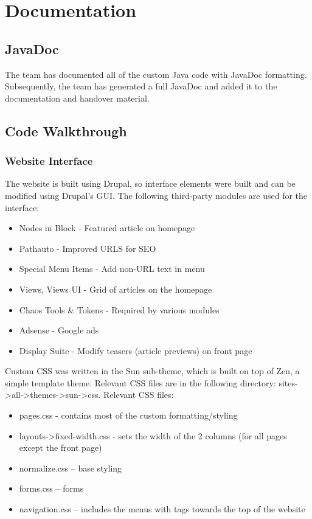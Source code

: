 \documentclass[11pt]{article} %
\begin{document}
\section{Documentation}

\subsection{JavaDoc}

The team has documented all of the custom Java code with JavaDoc formatting. Subsequently, the team has generated a full JavaDoc and added it to the documentation and handover material.

\subsection{Code Walkthrough}

\subsubsection{Website Interface}

The website is built using Drupal, so interface elements were built and can be modified using Drupal’s GUI. The following third-party modules are used for the interface:

\begin{itemize}
\item Nodes in Block - Featured article on homepage
\item Pathauto - Improved URLS for SEO
\item Special Menu Items - Add non-URL text in menu
\item Views, Views UI - Grid of articles on the homepage
\item Chaos Tools \& Tokens - Required by various modules
\item Adsense - Google ads
\item Display Suite - Modify teasers (article previews) on front page
\end{itemize}

Custom CSS was written in the Sun sub-theme, which is built on top of Zen, a simple template theme. Relevant CSS files are in the following directory: sites-\textgreater all-\textgreater themes-\textgreater sun-\textgreater css.
Relevant CSS files:

\begin{itemize}
\item pages.css - contains most of the custom formatting/styling
\item layouts-\textgreater fixed-width.css - sets the width of the 2 columns (for all pages except the front page)
\item normalize.css – base styling
\item forms.css – forms
\item navigation.css – includes the menus with tags towards the top of the website
\end{itemize}
\end{document}
